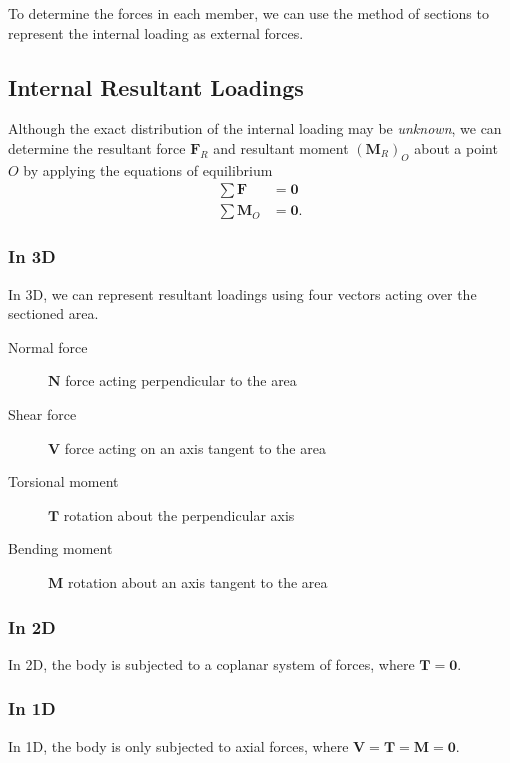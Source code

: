\documentclass{article}
\begin{document}
To determine the forces in each member, we can use the method of sections to represent the internal loading as external forces.
\subsection{Internal Resultant Loadings}
Although the exact distribution of the internal loading may be \textit{unknown}, we can determine the
resultant force \(\symbf{F}_R\) and resultant moment \(\left( \symbf{M}_R \right)_O\) about a point \(O\) by applying the
equations of equilibrium
\begin{align*}
    \sum \symbf{F}   & = \symbf{0}  \\
    \sum \symbf{M}_O & = \symbf{0}.
\end{align*}
\subsubsection{In 3D}
In 3D, we can represent resultant loadings using four vectors acting over the sectioned area.
\begin{description}
    \item[Normal force] \(\symbf{N}\) force acting perpendicular to the area
    \item[Shear force] \(\symbf{V}\) force acting on an axis tangent to the area
    \item[Torsional moment] \(\symbf{T}\) rotation about the perpendicular axis
    \item[Bending moment] \(\symbf{M}\) rotation about an axis tangent to the area
\end{description}
\subsubsection{In 2D}
In 2D, the body is subjected to a coplanar system of forces, where \(\symbf{T} = \symbf{0}\).
\subsubsection{In 1D}
In 1D, the body is only subjected to axial forces, where \(\symbf{V} = \symbf{T} = \symbf{M} = \symbf{0}\).
\end{document}
